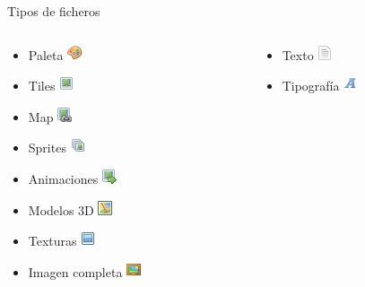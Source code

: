 \begin{frame}{Tipos de ficheros}
    \begin{columns}
    \begin{column}{0.5\textwidth}
        \begin{itemize}
            \item Paleta \includegraphics{imgs/palette.png}
            \item Tiles \includegraphics{imgs/picture.png}
            \item Map \includegraphics{imgs/picture_link.png}
            \item Sprites \includegraphics{imgs/pictures.png}
            \item Animaciones \includegraphics{imgs/picture_go.png}
            \item Modelos 3D \includegraphics{imgs/map.png}
            \item Texturas \includegraphics{imgs/image.png}
            \item Imagen completa \includegraphics{imgs/photo.png}
        \end{itemize}
    \end{column}
    \hfill
    \begin{column}{0.5\textwidth}
        \begin{itemize}
            \item Texto \includegraphics{imgs/page_white_text.png}
            \item Tipografía \includegraphics{imgs/font.png}

\end{itemize}
\end{column}
\end{columns}
\end{frame}
